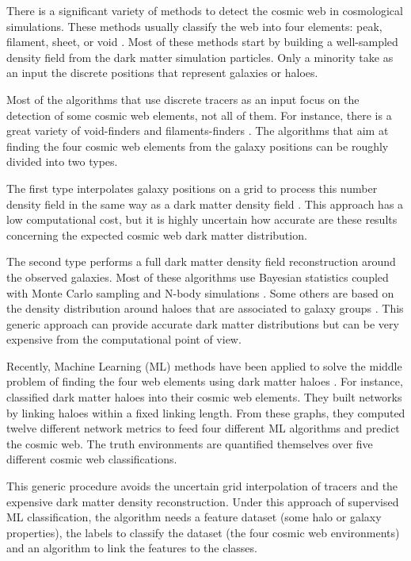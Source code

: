 \documentclass[usenatbib]{mnras}
\begin{document}
There is a significant variety of methods to detect
the cosmic web in cosmological simulations.
These methods usually classify the web into four
elements: peak, filament, sheet, or void \citep{Libeskind2018}.
Most of these methods start by building a well-sampled density field
from the dark matter simulation particles.
Only a minority take as an input the discrete positions that
represent galaxies or haloes.

Most of the algorithms that use discrete tracers as an input focus on
the detection of some cosmic web elements, not all of them. 
For instance, there is a great variety of void-finders
\citep{Platen2007,Neyrinck2008} and filaments-finders
\citep{Novikov2003,Zhang2009,Sousbie2010,Chen2015,Luber2019}.   
The algorithms that aim at finding the four cosmic web elements from
the galaxy positions can be roughly divided into two types.

The first type interpolates galaxy positions on a grid to process
this number density field in the same way as a dark matter density
field \citep{Eardley2015,Alpaslan2016,Tojeiro2017,Shadab2019}.
This approach has a low computational cost, but it is highly uncertain
how accurate are these results concerning the expected cosmic
web dark matter distribution.

The second type performs a full dark matter density field
reconstruction around the observed galaxies.
Most of these algorithms use Bayesian statistics coupled with Monte
Carlo sampling and N-body
simulations \citep{Jasche2010,Jasche2013a,Bos2014,LeclercqJasche2015,Horowitz2019,Burchett2020}. 
Some others are based on the density distribution around haloes that
are associated to galaxy groups \citep{Wang2009,Munoz-Cuartas2011}.
This generic approach can provide accurate dark matter distributions but can
be very expensive from the computational point of view.

Recently, Machine Learning (ML) methods 
have been applied to solve the middle problem 
of finding the four web elements using dark matter haloes \citep{Hui2018, Tsizh2019}.
For instance, 
\citep{Tsizh2019} classified dark matter haloes 
into their cosmic web elements. 
They built networks by linking haloes within a fixed linking length. 
From these graphs, 
they computed twelve different network metrics 
to feed four different ML algorithms and predict the cosmic web. The truth environments are quantified themselves over five different cosmic web classifications.

This generic procedure avoids the uncertain grid interpolation of
tracers and the expensive dark matter density reconstruction. 
Under this approach of supervised ML classification, 
the algorithm needs a feature dataset (some halo or galaxy
properties), the labels to classify the dataset (the four cosmic web
environments) and an algorithm to link the features to the classes.
\end{document}
